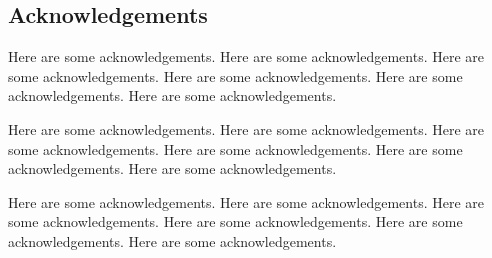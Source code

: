 \subsection*{Acknowledgements}

Here are some acknowledgements. Here are some acknowledgements. Here are some acknowledgements. Here are some acknowledgements. Here are some acknowledgements. Here are some acknowledgements.

Here are some acknowledgements. Here are some acknowledgements. Here are some acknowledgements. Here are some acknowledgements. Here are some acknowledgements. Here are some acknowledgements.

Here are some acknowledgements. Here are some acknowledgements. Here are some acknowledgements. Here are some acknowledgements. Here are some acknowledgements. Here are some acknowledgements.
